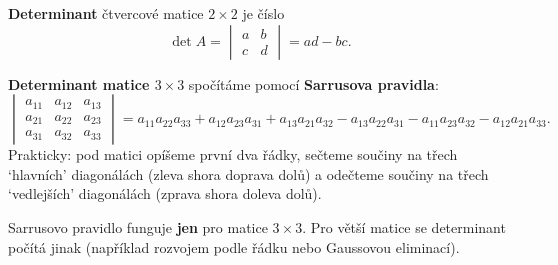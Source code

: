 \begin{definitionbox}
  \textbf{Determinant} čtvercové matice $2\times 2$ je číslo
  \begin{equation*}
    \det A = \begin{vmatrix} a & b\\ c & d \end{vmatrix} = ad - bc.
  \end{equation*}

  \textbf{Determinant matice $3\times 3$} spočítáme pomocí \textbf{Sarrusova pravidla}:
  \begin{equation*}
    \begin{vmatrix} a_{11} & a_{12} & a_{13}\\ a_{21} & a_{22} & a_{23}\\ a_{31} & a_{32} & a_{33} \end{vmatrix}
    = a_{11}a_{22}a_{33} + a_{12}a_{23}a_{31} + a_{13}a_{21}a_{32} - a_{13}a_{22}a_{31} - a_{11}a_{23}a_{32} - a_{12}a_{21}a_{33}.
  \end{equation*}
  Prakticky: pod matici opíšeme první dva řádky, sečteme součiny na třech `hlavních' diagonálách (zleva shora doprava dolů) a odečteme součiny na třech `vedlejších' diagonálách (zprava shora doleva dolů).
\end{definitionbox}

\begin{center}
\end{center}

\begin{note}
  Sarrusovo pravidlo funguje \textbf{jen} pro matice $3\times 3$. Pro větší matice se determinant počítá jinak (například rozvojem podle řádku nebo Gaussovou eliminací).
\end{note}

